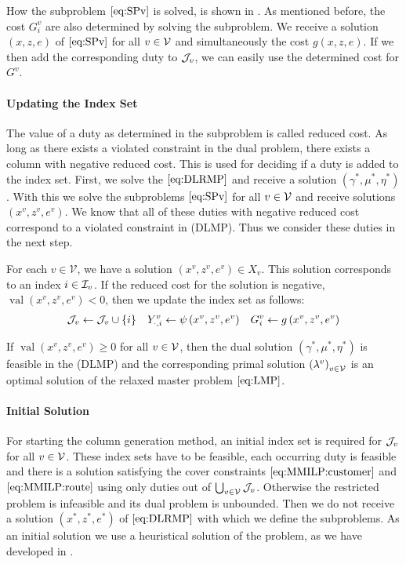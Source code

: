 How the subproblem $\eqref{eq:SPv}$ is solved, is shown in . As mentioned before, the cost $G^v_i$ are also determined by solving the subproblem. We receive a solution $(x,z,e)$ of $\eqref{eq:SPv}$ for all $v\in\mathcal{V}$ and simultaneously the cost $g(x,z,e)$. If we then add the corresponding duty to $\mathcal{J}_v$, we can easily use the determined cost for $G^v$.

\paragraph{Updating the Index Set} \parfill

The value of a duty as determined in the subproblem is called reduced cost. As long as there exists a violated constraint in the dual problem, there exists a column with negative reduced cost. This is used for deciding if a duty is added to the index set. First, we solve the $\eqref{eq:DLRMP}$ and receive a solution $\left(\gamma^*,\mu^*,\eta^*\right)$. With this we solve the subproblems $\eqref{eq:SPv}$ for all $v\in\mathcal{V}$ and receive solutions $\left(x^v,z^v,e^v\right)$. We know that all of these duties with negative reduced cost correspond to a violated constraint in (DLMP). Thus we consider these duties in the next step. 

For each $v\in\mathcal{V}$, we have a solution ${\left(x^v,z^v,e^v\right)\in X_v}$. This solution corresponds to an index ${i\in\mathcal{I}_v}$. If the reduced cost for the solution is negative, \ie $\operatorname{val}\left(x^v,z^v,e^v\right)<0$, then we update the index set as follows:
\begin{align*}
	\mathcal{J}_v\gets\mathcal{J}_v\cup\{i\} && Y^v_{\cdot,i}\gets\psi\left(x^v,z^v,e^v\right) && G^v_i\gets g\left(x^v,z^v,e^v\right)
\end{align*}

If $\operatorname{val}\left(x^v,z^v,e^v\right)\geq 0$ for all $v\in\mathcal{V}$, then the dual solution $\left(\gamma^*,\mu^*,\eta^*\right)$ is feasible in the (DLMP) and the corresponding primal solution $\left(\lambda^v\right)_{v\in\mathcal{V}}$ is an optimal solution of the relaxed master problem $\eqref{eq:LMP}$.

\paragraph{Initial Solution} \parfill

For starting the column generation method, an initial index set is required for $\mathcal{J}_v$ for all $v\in\mathcal{V}$. These index sets have to be feasible, \ie each occurring duty is feasible and there is a solution satisfying the cover constraints $\eqref{eq:MMILP:customer}$ and $\eqref{eq:MMILP:route}$ using only duties out of $\bigcup_{v\in\mathcal{V}}\mathcal{J}_v$. Otherwise the restricted problem is infeasible and its dual problem is unbounded. Then we do not receive a solution $\left(x^*,z^*,e^*\right)$ of $\eqref{eq:DLRMP}$ with which we define the subproblems. As an initial solution we use a heuristical solution of the problem, as we have developed in .

